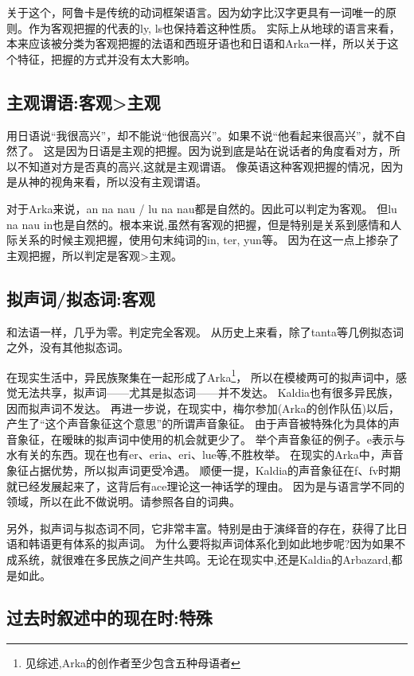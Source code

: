 关于这个，阿鲁卡是传统的动词框架语言。因为幼字比汉字更具有一词唯一的原则。作为客观把握的代表的ly, ls也保持着这种性质。
实际上从地球的语言来看，本来应该被分类为客观把握的法语和西班牙语也和日语和Arka一样，所以关于这个特征，把握的方式并没有太大影响。

\subsection{主观谓语:客观>主观}

用日语说“我很高兴”，却不能说“他很高兴”。如果不说“他看起来很高兴”，就不自然了。
这是因为日语是主观的把握。因为说到底是站在说话者的角度看对方，所以不知道对方是否真的高兴,这就是主观谓语。
像英语这种客观把握的情况，因为是从神的视角来看，所以没有主观谓语。

对于Arka来说，an na nau / lu na nau都是自然的。因此可以判定为客观。
但lu na nau in也是自然的。根本来说,虽然有客观的把握，但是特别是关系到感情和人际关系的时候主观把握，使用句末纯词的in, ter, yun等。
因为在这一点上掺杂了主观把握，所以判定是客观>主观。
\subsection{拟声词/拟态词:客观}

和法语一样，几乎为零。判定完全客观。
从历史上来看，除了tanta等几例拟态词之外，没有其他拟态词。

在现实生活中，异民族聚集在一起形成了Arka\footnote{见综述,Arka的创作者至少包含五种母语者}，
所以在模棱两可的拟声词中，感觉无法共享，拟声词——尤其是拟态词——并不发达。
Kaldia也有很多异民族，因而拟声词不发达。
再进一步说，在现实中，梅尔参加(Arka的创作队伍)以后，产生了“这个声音象征这个意思”的所谓声音象征。
由于声音被特殊化为具体的声音象征，在暧昧的拟声词中使用的机会就更少了。
举个声音象征的例子。e表示与水有关的东西。现在也有er、eria、eri、lue等,不胜枚举。
在现实的Arka中，声音象征占据优势，所以拟声词更受冷遇。
顺便一提，Kaldia的声音象征在f、fv时期就已经发展起来了，这背后有ace理论这一神话学的理由。
因为是与语言学不同的领域，所以在此不做说明。请参照各自的词典。

另外，拟声词与拟态词不同，它非常丰富。特别是由于演绎音的存在，获得了比日语和韩语更有体系的拟声词。
为什么要将拟声词体系化到如此地步呢?因为如果不成系统，就很难在多民族之间产生共鸣。无论在现实中,还是Kaldia的Arbazard,都是如此。

\subsection{过去时叙述中的现在时:特殊}


